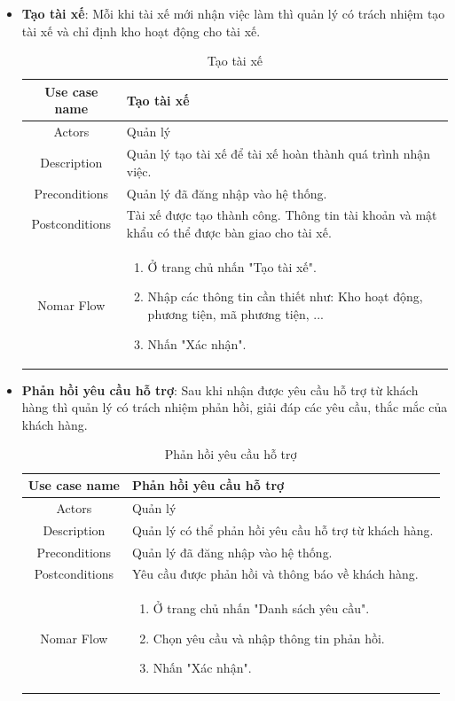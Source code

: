 \begin{itemize}
\begin{itemize}
			\item \textbf{Tạo tài xế}: Mỗi khi tài xế mới nhận việc làm thì quản lý có trách nhiệm tạo tài xế và chỉ định kho hoạt động cho tài xế.
			
			\begin{table}[!htp]
				\centering\begin{tabular}{|c|m{25em}|}
					\hline 
					Use case name & Tạo tài xế\\ 
					\hline 
					Actors & Quản lý \\ 
					\hline
					Description & Quản lý tạo tài xế để tài xế hoàn thành quá trình nhận việc. \\
					\hline 
					Preconditions & Quản lý đã đăng nhập vào hệ thống. \\
					\hline
					Postconditions & Tài xế được tạo thành công. Thông tin tài khoản và mật khẩu có thể được bàn giao cho tài xế. \\
					\hline
					Nomar Flow & \begin{enumerate}
						\item Ở trang chủ nhấn "Tạo tài xế".
						\item Nhập các thông tin cần thiết như: Kho hoạt động, phương tiện, mã phương tiện, ...
						\item Nhấn "Xác nhận".
					\end{enumerate}
					\\
					\hline
				\end{tabular}
				\caption{Tạo tài xế}
			\end{table}
		
			\item \textbf{Phản hồi yêu cầu hỗ trợ}: Sau khi nhận được yêu cầu hỗ trợ từ khách hàng thì quản lý có trách nhiệm phản hồi, giải đáp các yêu cầu, thắc mắc của khách hàng.
			
			\begin{table}[!htp]
				\centering\begin{tabular}{|c|m{25em}|}
					\hline 
					Use case name & Phản hồi yêu cầu hỗ trợ\\ 
					\hline 
					Actors & Quản lý \\ 
					\hline
					Description & Quản lý có thể phản hồi yêu cầu hỗ trợ từ khách hàng. \\
					\hline 
					Preconditions & Quản lý đã đăng nhập vào hệ thống. \\
					\hline
					Postconditions & Yêu cầu được phản hồi và thông báo về khách hàng. \\
					\hline
					Nomar Flow & \begin{enumerate}
						\item Ở trang chủ nhấn "Danh sách yêu cầu".
						\item Chọn yêu cầu và nhập thông tin phản hồi.
						\item Nhấn "Xác nhận".
					\end{enumerate}
					\\
					\hline
				\end{tabular}
				\caption{Phản hồi yêu cầu hỗ trợ}
			\end{table}
		

\end{itemize}
\end{itemize}
